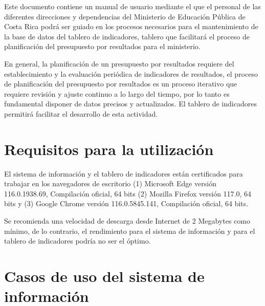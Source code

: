 \documentclass[a4paper, 9pt, conference]{article}              %
\begin{document}
Este documento contiene un manual de usuario mediante el que el personal de las diferentes direcciones y dependencias del Ministerio de Educaci\'on P\'ublica de Costa Rica podr\'a ser guiado en los procesos necesarios para el mantenimiento de la base de datos del tablero de indicadores, tablero que facilitar\'a el proceso de planificaci\'on del presupuesto por resultados para el ministerio.

En general, la planificaci\'on de un presupuesto por resultados requiere del establecimiento y la evaluaci\'on peri\'odica de indicadores de resultados, el proceso de planificaci\'on del presupuesto por resultados es un proceso iterativo que requiere revisi\'on y ajuste continuo a lo largo del tiempo, por lo tanto es fundamental disponer de datos precisos y actualizados. El tablero de indicadores permitir\'a facilitar el desarrollo de esta actividad.

\section{Requisitos para la utilizaci\'on} \label{sec:req}

El sistema de informaci\'on y el tablero de indicadores est\'an certificados para trabajar en los navegadores de escritorio (1) Microsoft Edge versi\'on 116.0.1938.69, Compilaci\'on oficial, 64 bits (2) Mozilla Firefox versi\'on 117.0, 64 bits y (3) Google Chrome versi\'on 116.0.5845.141, Compilaci\'on oficial, 64 bits.

Se recomienda una velocidad de descarga desde Internet de 2 Megabytes como m\'inimo, de lo contrario, el rendimiento para el sistema de informaci\'on y para el tablero de indicadores podr\'ia no ser el \'optimo.

\section{Casos de uso del sistema de informaci\'on} \label{sec:use}
\end{document}
